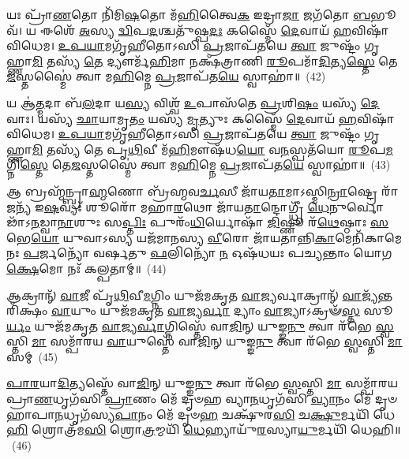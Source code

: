 {%
{\anuvakamend[{𑌅𑌶𑌾॑𑌨𑍍𑌤𑌃 𑌸𑍁𑌷𑍁\-\ul{𑌵𑌾}\-𑌣𑍇𑌨𑍈𑌕᳴𑌚𑌤𑍍𑌵𑌾𑌰𑌿𑍞𑌶𑌚𑍍𑌚}]}%

𑌯𑌃 𑌪𑍍𑌰𑌾᳴\-\ul{𑌣}\-𑌤𑍋 𑌨𑌿᳴𑌮𑌿\-\ul{𑌷}\-𑌤𑍋 𑌮᳴\-\ul{𑌹𑌿}\-𑌤𑍍𑌵𑍈\-\ul{𑌕} 𑌇𑌦𑍍𑌰𑌾\-\ul{𑌜𑌾} 𑌜𑌗᳴𑌤𑍋 \ul{𑌬}\-𑌭𑍂𑌵᳴। 𑌯 𑌈𑌶𑍇᳴ \ul{𑌅}\-𑌸𑍍𑌯 \ul{𑌦𑍍𑌵𑌿}\-𑌪\-\ul{𑌦}\-𑌶𑍍𑌚𑌤𑍁᳴𑌷𑍍𑌪\-\ul{𑌦𑌃} 𑌕𑌸𑍍𑌮𑍈᳴ \ul{𑌦𑍇}\-𑌵𑌾𑌯᳴ \ul{𑌹}\-𑌵𑌿𑌷𑌾᳴ 𑌵𑌿𑌧𑍇𑌮। \ul{𑌉}\-\-\ul{𑌪}\-\-\ul{𑌯𑌾}\-𑌮𑌗𑍃᳴𑌹𑍀𑌤𑍋\-𑌽𑌸𑌿 \ul{𑌪𑍍𑌰}\-𑌜𑌾𑌪᳴𑌤𑌯𑍇 \ul{𑌤𑍍𑌵𑌾} 𑌜𑍁𑌷𑍍𑌟𑌂᳴ 𑌗𑍃𑌹𑍍𑌣𑌾\-\ul{𑌮𑌿} 𑌤𑌸𑍍𑌯᳴ \ul{𑌤𑍇} 𑌦𑍍𑌯𑍗𑌰𑍍𑌮᳴\-\ul{𑌹𑌿}\-𑌮𑌾 𑌨𑌕𑍍𑌷᳴𑌤𑍍𑌰𑌾𑌣𑌿 \ul{𑌰𑍂}\-𑌪𑌮𑌾᳴\-\ul{𑌦𑌿}\-𑌤𑍍𑌯\-\ul{𑌸𑍍𑌤𑍇} 𑌤𑍇\-\ul{𑌜}\-𑌸𑍍𑌤𑌸𑍍𑌮𑍈॑ 𑌤𑍍𑌵𑌾 𑌮\-\ul{𑌹𑌿}\-𑌮𑍍𑌨𑍇 \ul{𑌪𑍍𑌰}\-𑌜𑌾𑌪᳴𑌤\-\ul{𑌯𑍇} 𑌸𑍍𑌵𑌾𑌹𑌾॑॥~(42)

{\anuvakamend[{𑌯𑌃 𑌪𑍍𑌰𑌾᳴\-\ul{𑌣}\-𑌤𑍋 𑌦𑍍𑌯𑍗𑌰𑌾᳴\-\ul{𑌦𑌿}\-𑌤𑍍𑌯𑍋॑\-𑌽𑌷𑍍𑌟𑌾𑌤𑍍𑌰𑌿𑍞᳴𑌶𑌤𑍍}]}%

𑌯 𑌆॑\-\ul{𑌤𑍍𑌮}\-𑌦𑌾 𑌬᳴\-\ul{𑌲}\-𑌦𑌾 𑌯\-\ul{𑌸𑍍𑌯} 𑌵𑌿𑌶𑍍𑌵᳴ \ul{𑌉}\-𑌪𑌾𑌸᳴𑌤𑍇 \ul{𑌪𑍍𑌰}\-𑌶𑌿\-\ul{𑌷𑌂} 𑌯𑌸𑍍𑌯᳴ \ul{𑌦𑍇}\-𑌵𑌾𑌃। 𑌯𑌸𑍍𑌯᳴ \ul{𑌛𑌾}\-𑌯𑌾𑌮𑍃\-\ul{𑌤𑌂} 𑌯𑌸𑍍𑌯᳴ \ul{𑌮𑍃}\-𑌤𑍍𑌯𑍁𑌃 𑌕𑌸𑍍𑌮𑍈᳴ \ul{𑌦𑍇}\-𑌵𑌾𑌯᳴ \ul{𑌹}\-𑌵𑌿𑌷𑌾᳴ 𑌵𑌿𑌧𑍇𑌮। \ul{𑌉}\-\-\ul{𑌪}\-\-\ul{𑌯𑌾}\-𑌮𑌗𑍃᳴𑌹𑍀𑌤𑍋\-𑌽𑌸𑌿 \ul{𑌪𑍍𑌰}\-𑌜𑌾𑌪᳴𑌤𑌯𑍇 \ul{𑌤𑍍𑌵𑌾} 𑌜𑍁𑌷𑍍𑌟𑌂᳴ 𑌗𑍃𑌹𑍍𑌣𑌾\-\ul{𑌮𑌿} 𑌤𑌸𑍍𑌯᳴ 𑌤𑍇 𑌪𑍃\-\ul{𑌥𑌿}\-𑌵𑍀 𑌮᳴\-\ul{𑌹𑌿}\-𑌮𑍗𑌷᳴𑌧\-\ul{𑌯𑍋} 𑌵\-\ul{𑌨}\-𑌸𑍍𑌪𑌤᳴𑌯𑍋 \ul{𑌰𑍂}\-𑌪\-\ul{𑌮}\-𑌗𑍍𑌨𑌿\-\ul{𑌸𑍍𑌤𑍇} 𑌤𑍇\-\ul{𑌜}\-𑌸𑍍𑌤𑌸𑍍𑌮𑍈॑ 𑌤𑍍𑌵𑌾 𑌮\-\ul{𑌹𑌿}\-𑌮𑍍𑌨𑍇 \ul{𑌪𑍍𑌰}\-𑌜𑌾𑌪᳴𑌤\-\ul{𑌯𑍇} 𑌸𑍍𑌵𑌾𑌹𑌾॑॥~(43)

{\anuvakamend[{𑌯 𑌆॑\-\ul{𑌤𑍍𑌮}\-𑌦𑌾𑌃 𑌪𑍃᳴\-\ul{𑌥𑌿}\-𑌵𑍍𑌯᳴𑌗𑍍𑌨𑌿𑌰𑍇\-\ul{𑌕𑌾}\-𑌨𑍍𑌨𑌚᳴𑌤𑍍𑌵𑌾\-\ul{𑌰𑌿}\-\-\ul{𑍞}\-𑌶𑌤𑍍}]}%

𑌆 𑌬𑍍𑌰𑌹𑍍𑌮᳴𑌨𑍍𑌬𑍍𑌰𑌾\-\ul{𑌹𑍍𑌮}\-𑌣𑍋 𑌬𑍍𑌰᳴𑌹𑍍𑌮𑌵\-\ul{𑌰𑍍𑌚}\-𑌸𑍀 𑌜𑌾᳴𑌯\-\ul{𑌤𑌾}\-𑌮𑌾\-𑌽𑌸𑍍𑌮𑌿\-\ul{𑌨𑍍𑌰𑌾}\-𑌷𑍍𑌟𑍍𑌰𑍇 𑌰𑌾᳴\-\ul{𑌜}\-𑌨𑍍𑌯᳴ 𑌇\-\ul{𑌷}\-𑌵𑍍𑌯𑌃᳴ 𑌶𑍂𑌰𑍋᳴ 𑌮𑌹𑌾\-\ul{𑌰}\-𑌥𑍋 𑌜𑌾᳴𑌯\-\ul{𑌤𑌾}\-𑌨𑍍𑌦𑍋𑌗𑍍𑌧𑍍𑌰𑍀᳴ \ul{𑌧𑍇}\-𑌨𑍁𑌰𑍍𑌵𑍋𑌢𑌾᳴\-𑌽\-\-\ul{𑌨}\-𑌡𑍍𑌵𑌾\-\ul{𑌨𑌾}\-𑌶𑍁𑌃 𑌸\-\ul{𑌪𑍍𑌤𑌿𑌃} 𑌪𑍁𑌰𑌂᳴\-\ul{𑌧𑌿}\-𑌰𑍍𑌯𑍋𑌷𑌾᳴ \ul{𑌜𑌿}\-𑌷𑍍𑌣𑍂 𑌰᳴\-\ul{𑌥𑍇}\-𑌷𑍍𑌠𑌾𑌃 \ul{𑌸}\-𑌭𑍇\-\ul{𑌯𑍋} 𑌯𑍁𑌵𑌾\-𑌽𑌸𑍍𑌯 𑌯𑌜᳴𑌮𑌾𑌨𑌸𑍍𑌯 \ul{𑌵𑍀}\-𑌰𑍋 𑌜𑌾᳴𑌯𑌤𑌾𑌨𑍍𑌨𑌿\-\ul{𑌕𑌾}\-𑌮𑍇𑌨𑌿᳴𑌕𑌾𑌮𑍇 𑌨𑌃 \ul{𑌪}\-𑌰𑍍𑌜𑌨𑍍𑌯𑍋᳴ 𑌵𑌰𑍍\mbox{}𑌷𑌤𑍁 \ul{𑌫}\-𑌲𑌿𑌨𑍍𑌯𑍋᳴ \ul{𑌨} 𑌓𑌷᳴𑌧𑌯𑌃 𑌪𑌚𑍍𑌯𑌨𑍍𑌤𑌾𑌂 𑌯𑍋𑌗\-\ul{𑌕𑍍𑌷𑍇}\-𑌮𑍋 𑌨𑌃᳴ 𑌕𑌲𑍍𑌪𑌤𑌾𑌮𑍍॥~(44)

{\anuvakamend[{𑌆 𑌬𑍍𑌰\-\ul{𑌹𑍍𑌮}\-𑌨𑍍𑌨𑍇𑌕᳴𑌚𑌤𑍍𑌵𑌾𑌰𑌿𑍞𑌶𑌤𑍍}]}%

𑌆𑌕𑍍𑌰𑌾𑌨𑍍᳴ \ul{𑌵𑌾}\-𑌜𑍀 𑌪𑍃᳴\-\ul{𑌥𑌿}\-𑌵𑍀\-\ul{𑌮}\-𑌗𑍍𑌨𑌿𑌂 𑌯𑍁𑌜᳴𑌮𑌕𑍃𑌤 \ul{𑌵𑌾}\-𑌜𑍍𑌯𑌰𑍍𑌵𑌾𑌕𑍍𑌰𑌾𑌨𑍍᳴ \ul{𑌵𑌾}\-𑌜𑍍𑌯᳴𑌨𑍍𑌤𑌰𑌿᳴𑌕𑍍𑌷𑌂 \ul{𑌵𑌾}\-𑌯𑍁𑌂 𑌯𑍁𑌜᳴𑌮𑌕𑍃𑌤 \ul{𑌵𑌾}\-𑌜𑍍𑌯\-\ul{𑌰𑍍𑌵𑌾} 𑌦𑍍𑌯𑌾𑌂 \ul{𑌵𑌾}\-𑌜𑍍𑌯𑌾\-𑌽𑌕𑍍𑌰𑍟᳴\-\ul{𑌸𑍍𑌤} 𑌸𑍂\-\ul{𑌰𑍍𑌯𑌂} 𑌯𑍁𑌜᳴𑌮𑌕𑍃𑌤 \ul{𑌵𑌾}\-𑌜𑍍𑌯\-\ul{𑌰𑍍𑌵𑌾}\-𑌗𑍍𑌨𑌿𑌸𑍍𑌤𑍇᳴ 𑌵𑌾\-\ul{𑌜𑌿}\-𑌨𑍍 𑌯𑍁𑌙𑍍𑌙\-\ul{𑌨𑍁} 𑌤𑍍𑌵𑌾 𑌰᳴𑌭𑍇 \ul{𑌸𑍍𑌵}\-𑌸𑍍𑌤𑌿 \ul{𑌮𑌾} 𑌸𑌮𑍍𑌪𑌾᳴𑌰𑌯 \ul{𑌵𑌾}\-𑌯𑍁𑌸𑍍𑌤𑍇᳴ 𑌵𑌾\-\ul{𑌜𑌿}\-𑌨𑍍 𑌯𑍁𑌙𑍍𑌙\-\ul{𑌨𑍁} 𑌤𑍍𑌵𑌾 𑌰᳴𑌭𑍇 \ul{𑌸𑍍𑌵}\-𑌸𑍍𑌤𑌿 \ul{𑌮𑌾} 𑌸𑌮𑍍~(45)

\-\ul{𑌪𑌾}\-\-\ul{𑌰}\-𑌯𑌾\-\ul{𑌦𑌿}\-𑌤𑍍𑌯𑌸𑍍𑌤𑍇᳴ 𑌵𑌾\-\ul{𑌜𑌿}\-𑌨𑍍 𑌯𑍁𑌙𑍍𑌙\-\ul{𑌨𑍁} 𑌤𑍍𑌵𑌾 𑌰᳴𑌭𑍇 \ul{𑌸𑍍𑌵}\-𑌸𑍍𑌤𑌿 \ul{𑌮𑌾} 𑌸𑌮𑍍𑌪𑌾᳴𑌰𑌯 𑌪𑍍𑌰𑌾\-\ul{𑌣}\-𑌧𑍃𑌗᳴𑌸𑌿 \ul{𑌪𑍍𑌰𑌾}\-𑌣𑌂 𑌮𑍇᳴ 𑌦𑍃𑍞𑌹 𑌵𑍍𑌯𑌾\-\ul{𑌨}\-𑌧𑍃𑌗᳴𑌸𑌿 \ul{𑌵𑍍𑌯𑌾}\-𑌨𑌂 𑌮𑍇᳴ 𑌦𑍃𑍞𑌹𑌾𑌪𑌾\-\ul{𑌨}\-𑌧𑍃𑌗᳴𑌸𑍍𑌯\-\ul{𑌪𑌾}\-𑌨𑌂 𑌮𑍇᳴ 𑌦𑍃𑍞\-\ul{𑌹} 𑌚𑌕𑍍𑌷𑍁᳴𑌰\-\ul{𑌸𑌿} 𑌚\-\ul{𑌕𑍍𑌷𑍁}\-𑌰𑍍𑌮𑌯𑌿᳴ 𑌧𑍇\-\ul{𑌹𑌿} 𑌶𑍍𑌰𑍋𑌤𑍍𑌰᳴𑌮\-\ul{𑌸𑌿} 𑌶𑍍𑌰𑍋\-\ul{𑌤𑍍𑌰}\-𑌮𑍍𑌮𑌯𑌿᳴ \ul{𑌧𑍇}\-𑌹𑍍𑌯𑌾𑌯𑍁᳴\-\ul{𑌰}\-𑌸𑍍𑌯𑌾\-\ul{𑌯𑍁}\-𑌰𑍍𑌮𑌯𑌿᳴ 𑌧𑍇𑌹𑌿॥~(46)

}
